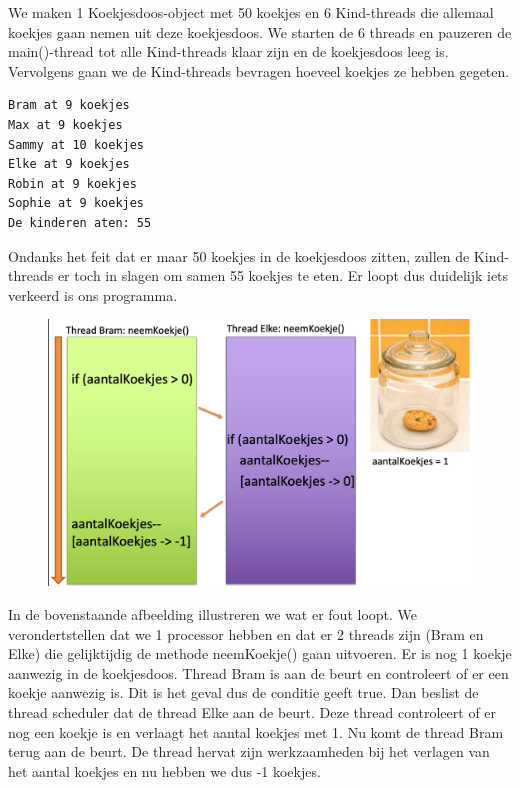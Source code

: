 \documentclass{tstextbook}
\begin{document}
We maken 1 Koekjesdoos-object met 50 koekjes en 6 Kind-threads die allemaal koekjes gaan nemen uit deze koekjesdoos. We starten de 6 threads en pauzeren de main()-thread tot alle Kind-threads klaar zijn en de koekjesdoos leeg is. Vervolgens gaan we de Kind-threads bevragen hoeveel koekjes ze hebben gegeten.

\begin{verbatim}
Bram at 9 koekjes
Max at 9 koekjes
Sammy at 10 koekjes
Elke at 9 koekjes
Robin at 9 koekjes
Sophie at 9 koekjes
De kinderen aten: 55
\end{verbatim}

Ondanks het feit dat er maar 50 koekjes in de koekjesdoos zitten, zullen de Kind-threads er toch in slagen om samen 55 koekjes te eten. Er loopt dus duidelijk iets verkeerd is ons programma.

\begin{figure}[H]
  \includegraphics[width=\linewidth]{images/h9/koekjesdoos.png}
  \label{fig:concurrent_access}
\end{figure}

In de bovenstaande afbeelding illustreren we wat er fout loopt.
We verondertstellen dat we 1 processor hebben en dat er 2 threads zijn (Bram en Elke) die gelijktijdig de methode neemKoekje() gaan uitvoeren. Er is nog 1 koekje aanwezig in de koekjesdoos.
Thread Bram is aan de beurt en controleert of er een koekje aanwezig is. Dit is het geval dus de conditie geeft true. Dan beslist de thread scheduler dat de thread Elke  aan de beurt. Deze thread controleert of er nog een koekje is en verlaagt het aantal koekjes met 1. Nu komt de thread Bram terug aan de beurt. De thread hervat zijn werkzaamheden bij het verlagen van het aantal koekjes en nu hebben we dus -1 koekjes. 
\end{document}
